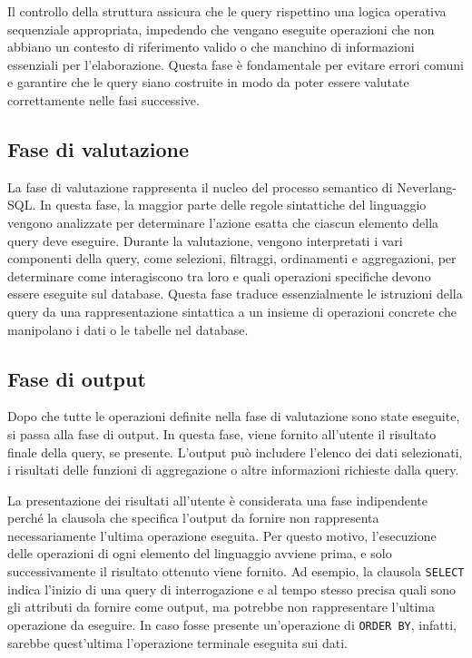 \documentclass[12pt,a4paper,openright,twoside]{book}
\begin{document}
Il controllo della struttura assicura che le query rispettino una logica operativa sequenziale appropriata, impedendo che vengano eseguite 
operazioni che non abbiano un contesto di riferimento valido o che manchino di informazioni essenziali per l’elaborazione. Questa fase è 
fondamentale per evitare errori comuni e garantire che le query siano costruite in modo da poter essere valutate correttamente nelle fasi 
successive.

\subsection{Fase di valutazione}
La fase di valutazione rappresenta il nucleo del processo semantico di Neverlang-SQL. In questa fase, la maggior parte delle regole 
sintattiche del linguaggio vengono analizzate per determinare l’azione esatta che ciascun elemento della query deve eseguire. Durante la 
valutazione, vengono interpretati i vari componenti della query, come selezioni, filtraggi, ordinamenti e aggregazioni, per determinare come 
interagiscono tra loro e quali operazioni specifiche devono essere eseguite sul database. Questa fase traduce essenzialmente le istruzioni 
della query da una rappresentazione sintattica a un insieme di operazioni concrete che manipolano i dati o le tabelle nel database.

\subsection{Fase di output}
Dopo che tutte le operazioni definite nella fase di valutazione sono state eseguite, si passa alla fase di output. In questa fase, viene 
fornito all’utente il risultato finale della query, se presente. L’output può includere l’elenco dei dati selezionati, i risultati delle 
funzioni di aggregazione o altre informazioni richieste dalla query.

La presentazione dei risultati all’utente è considerata una fase indipendente perché la clausola che specifica l’output da fornire non 
rappresenta necessariamente l’ultima operazione eseguita. Per questo motivo, l’esecuzione delle operazioni di ogni elemento del linguaggio 
avviene prima, e solo successivamente il risultato ottenuto viene fornito. Ad esempio, la clausola \texttt{SELECT} indica l’inizio di una 
query di interrogazione e al tempo stesso precisa quali sono gli attributi da fornire come output, ma potrebbe non rappresentare l’ultima 
operazione da eseguire. In caso fosse presente un’operazione di \texttt{ORDER BY}, infatti, sarebbe quest’ultima l’operazione terminale 
eseguita sui dati.
\end{document}
